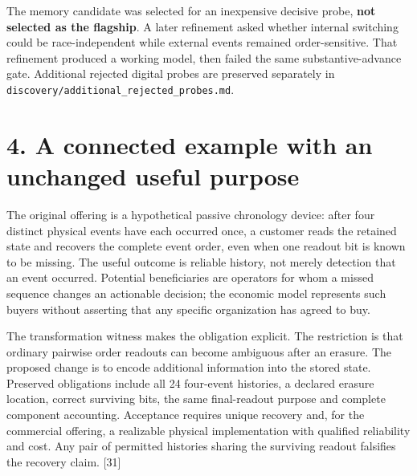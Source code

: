 \documentclass[
  11pt,
]{article}
\begin{document}
The memory candidate was selected for an inexpensive decisive probe,
\textbf{not selected as the flagship}. A later refinement asked whether
internal switching could be race-independent while external events
remained order-sensitive. That refinement produced a working model, then
failed the same substantive-advance gate. Additional rejected digital
probes are preserved separately in
\nolinkurl{discovery/additional_rejected_probes.md}.

\hypertarget{a-connected-example-with-an-unchanged-useful-purpose}{%
\section{4. A connected example with an unchanged useful
purpose}\label{a-connected-example-with-an-unchanged-useful-purpose}}

The original offering is a hypothetical passive chronology device: after
four distinct physical events have each occurred once, a customer reads
the retained state and recovers the complete event order, even when one
readout bit is known to be missing. The useful outcome is reliable
history, not merely detection that an event occurred. Potential
beneficiaries are operators for whom a missed sequence changes an
actionable decision; the economic model represents such buyers without
asserting that any specific organization has agreed to buy.

The transformation witness makes the obligation explicit. The
restriction is that ordinary pairwise order readouts can become
ambiguous after an erasure. The proposed change is to encode additional
information into the stored state. Preserved obligations include all 24
four-event histories, a declared erasure location, correct surviving
bits, the same final-readout purpose and complete component accounting.
Acceptance requires unique recovery and, for the commercial offering, a
realizable physical implementation with qualified reliability and cost.
Any pair of permitted histories sharing the surviving readout falsifies
the recovery claim. {[}31{]}
\end{document}
